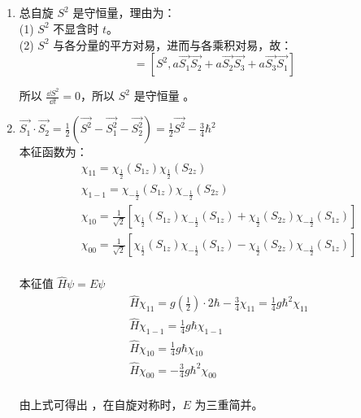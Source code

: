 \subsection{ }
\begin{enumerate}
\item 总自旋 $S^2$ 是守恒量，理由为：\\
(1) $S^2$ 不显含时 $t$。\\
(2) $S^2$ 与各分量的平方对易，进而与各乘积对易，故：\\
\begin{equation}
[S^2 ,H^2] = [S^2 , a \vec{S_1} \vec{S_2} + a \vec{S_2} \vec{S_3} + a \vec{S_3} \vec{S_1}]
\end{equation}

所以 $\frac{\dd{S^2}}{\dd{t}}=0$，所以 $S^2$ 是守恒量 。

\item $\displaystyle \vec{S_1} \cdot \vec{S_2} = \frac{1}{2} (\vec{S^2} -\vec{S^2_1} -\vec{S^2_2}) = \frac{1}{2} \vec{S^2} - \frac{3}{4} \hbar^2 $ \\

本征函数为：\\
\begin{equation}
\begin{aligned}
& \chi_{11} = \chi_{\frac{1}{2}}(S_{1z})\chi_{\frac{1}{2}}(S_{2z}) \\
& \chi_{1-1} = \chi_{-\frac{1}{2}}(S_{1z})\chi_{-\frac{1}{2}}(S_{2z}) \\
& \chi_{10} = \frac{1}{\sqrt{2}} \left[ \chi_{\frac{1}{2}}(S_{1z})\chi_{-\frac{1}{2}}(S_{1z}) + \chi_{\frac{1}{2}}(S_{2z})\chi_{-\frac{1}{2}}(S_{1z}) \right] \\
& \chi_{00} = \frac{1}{\sqrt{2}} \left[ \chi_{\frac{1}{2}}(S_{1z})\chi_{-\frac{1}{2}}(S_{1z}) - \chi_{\frac{1}{2}}(S_{2z})\chi_{-\frac{1}{2}}(S_{1z}) \right]  \\
\end{aligned}
\end{equation}

本征值 $\hat{H}\psi = E\psi $ \\
\begin{equation}
\begin{aligned}
& \hat{H}\chi_{11} = g(\frac{1}{2}) \cdot 2\hbar - \frac{3}{4} \chi_{11} = \frac{1}{4}g\hbar^{2} \chi_{11}  \\
& \hat{H}\chi_{1-1} = \frac{1}{4}g\hbar \chi_{1-1}  \\
& \hat{H}\chi_{10} = \frac{1}{4}g\hbar \chi_{10}  \\
& \hat{H}\chi_{00} = -\frac{3}{4}g\hbar^{2} \chi_{00}  \\
\end{aligned}
\end{equation}

由上式可得出 ，在自旋对称时，$E$ 为三重简并。
\end{enumerate}
